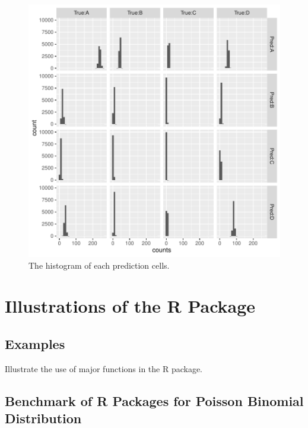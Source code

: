 \documentclass[12pt]{article}
\begin{document}
\begin{figure}
	\centering
	\includegraphics[scale=1.0]{figures/ConfusionHistogram.pdf}
	\caption{The histogram of each prediction cells.}
\end{figure}
\section{Illustrations of the R Package}
\subsection{Examples}
Illustrate the use of major functions in the R package.


\subsection{Benchmark of R Packages for Poisson Binomial Distribution}



\end{document}
